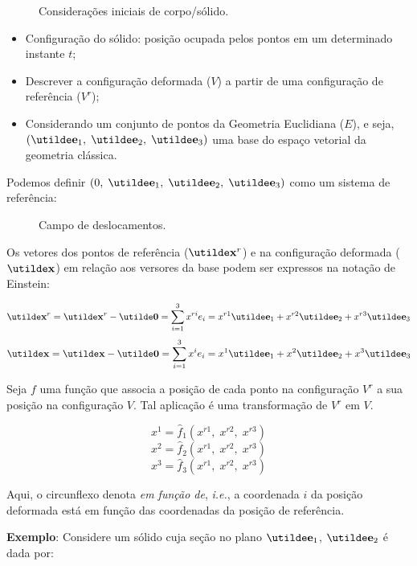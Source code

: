 \begin{figure}[H]
	\centering
	\caption{Considerações iniciais de corpo/sólido.}
	\vspace*{5mm}
	
\end{figure}

\begin{itemize}
	\item Configuração do sólido: posição ocupada pelos pontos em um determinado instante $t$;
	\item Descrever a configuração deformada ($V$) a partir de uma configuração de referência ($V^r$);
	\item \sloppy Considerando um conjunto de pontos da Geometria Euclidiana ($E$), e seja, $(\vt{e}_1,\;\vt{e}_2,\;\vt{e}_3)$ uma base do espaço vetorial da geometria clássica.
\end{itemize}
	
Podemos definir $(0,\;\vt{e}_1,\;\vt{e}_2,\;\vt{e}_3)$ como um sistema de referência:

\begin{figure}[H]
	\centering
	\caption{Campo de deslocamentos.}
	
\end{figure}
	
Os vetores dos pontos de referência ($\vt{x}^r$) e na configuração deformada ($\vt{x}$) em relação aos versores da base podem ser expressos na notação de Einstein:

\[\vt{x}^r=\vt{x}^r-\vt{0}=\sum_{i=1}^3x^{ri}e_i=x^{r1}\vt{e}_1+x^{r2}\vt{e}_2+x^{r3}\vt{e}_3\]
\[\vt{x}=\vt{x}-\vt{0}=\sum_{i=1}^3x^ie_i=x^1\vt{e}_1+x^2\vt{e}_2+x^3\vt{e}_3\]

Seja $f$ uma função que associa a posição de cada ponto na configuração $V^r$ a sua posição na configuração $V$. Tal aplicação é uma transformação de $V^r$ em $V$.
	
\[x^1=\hat{f}_1(x^{r1},\;x^{r2},\;x^{r3})\]
\[x^2=\hat{f}_2(x^{r1},\;x^{r2},\;x^{r3})\]
\[x^3=\hat{f}_3(x^{r1},\;x^{r2},\;x^{r3})\]

Aqui, o circunflexo denota \textit{em função de}, \textit{i.e.}, a coordenada $i$ da posição deformada está em função das coordenadas da posição de referência.
	
\textbf{Exemplo}: Considere um sólido cuja seção no plano $\vt{e}_1$, $\vt{e}_2$ é dada por:
	
\begin{figure}[H]
	\centering
	
\end{figure}
	
